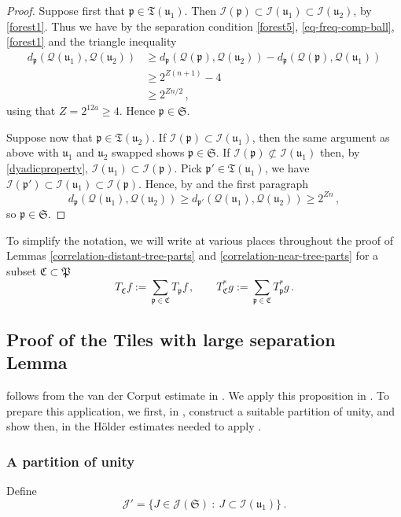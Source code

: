 \documentclass[10pt,a4paper]{article}
\theoremstyle{plain}
\theoremstyle{definition}
\numberwithin{equation}{subsection}
\newcommand{\fp}{{\mathfrak p}}
\newcommand{\fP}{{\mathfrak P}}
\newcommand{\fu}{{\mathfrak u}}
\newcommand{\fT}{{\mathfrak T}}
\newcommand{\fC}{{\mathfrak C}}
\newcommand{\scI}{{\mathcal{I}}} %
\newcommand{\fcc}{{\mathcal{Q}}}
\newcommand{\leanok}{}
\begin{document}
\begin{proof}
    \leanok
    Suppose first that $\fp \in \fT(\fu_1)$. Then $\scI(\fp) \subset \scI(\fu_1) \subset \scI(\fu_2)$, by \eqref{forest1}. Thus we have by the separation condition \eqref{forest5}, \eqref{eq-freq-comp-ball}, \eqref{forest1} and the triangle inequality
    \begin{align*}
        d_{\fp}(\fcc(\fu_1), \fcc(\fu_2)) &\ge d_{\fp}(\fcc(\fp), \fcc(\fu_2)) - d_{\fp}(\fcc(\fp), \fcc(\fu_1))\\
        &\ge 2^{Z(n+1)} - 4\\
        &\ge 2^{Zn/2}\,,
    \end{align*}
    using that $Z= 2^{12a}\ge 4$. Hence $\fp \in \mathfrak{S}$.

    Suppose now that $\fp \in \fT(\fu_2)$. If $\scI(\fp) \subset \scI(\fu_1)$, then the same argument as above with $\fu_1$ and $\fu_2$ swapped shows $\fp \in \mathfrak{S}$. If $\scI(\fp) \not \subset \scI(\fu_1)$ then, by \eqref{dyadicproperty}, $\scI(\fu_1) \subset \scI(\fp)$. Pick $\fp' \in \fT(\fu_1)$, we have $\scI(\fp') \subset \scI(\fu_1) \subset \scI(\fp)$. Hence, by  and the first paragraph
    $$
        d_{\fp}(\fcc(\fu_1), \fcc(\fu_2)) \ge d_{\fp'}(\fcc(\fu_1), \fcc(\fu_2)) \ge 2^{Zn}\,,
    $$
    so $\fp \in \mathfrak{S}$.
\end{proof}

To simplify the notation, we will write at various places throughout the proof of Lemmas \ref{correlation-distant-tree-parts} and \ref{correlation-near-tree-parts} for a subset $\fC \subset \fP$
$$
    T_{\fC} f := \sum_{\fp \in \fC} T_{\fp} f\,, \quad\quad T_{\fC}^* g := \sum_{\fp\in\fC} T_{\fp}^* g\,.
$$

\subsection{Proof of the Tiles with large separation Lemma}
    \label{subsec-big-tiles}

 follows from the van der Corput estimate in . We apply this proposition in . To prepare this application, we first, in , construct a suitable partition of unity, and show then, in  the H\"older estimates needed to apply .

\subsubsection{A partition of unity}
\label{subsubsec-pao}
    Define
    $$
        \mathcal{J}' = \{J \in \mathcal{J}(\mathfrak{S}) \ : \ J \subset \scI(\fu_1)\}\,.
    $$
\end{document}
